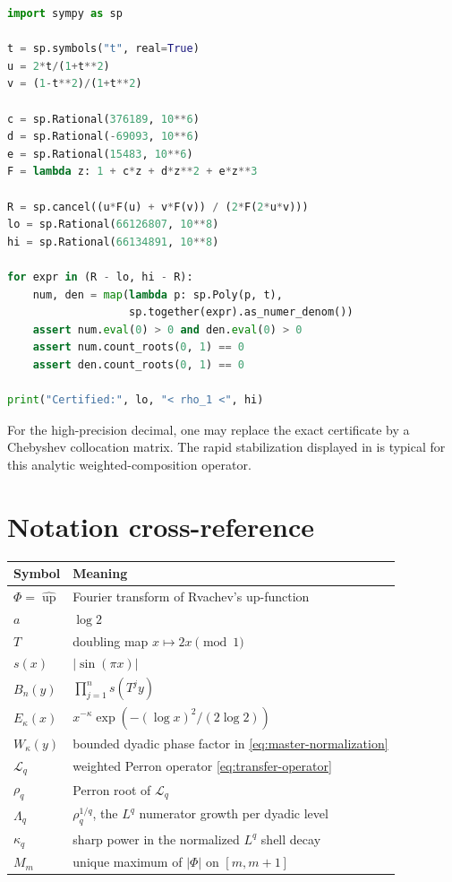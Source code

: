 \documentclass[11pt,oneside]{article}
\theoremstyle{definition}
\theoremstyle{remark}
\newcommand{\Up}{\operatorname{up}}
\newcommand{\Phiup}{\Phi}
\newcommand{\abs}[1]{\left|#1\right|}
\begin{document}
\begin{lstlisting}[style=code,language=Python]
import sympy as sp

t = sp.symbols("t", real=True)
u = 2*t/(1+t**2)
v = (1-t**2)/(1+t**2)

c = sp.Rational(376189, 10**6)
d = sp.Rational(-69093, 10**6)
e = sp.Rational(15483, 10**6)
F = lambda z: 1 + c*z + d*z**2 + e*z**3

R = sp.cancel((u*F(u) + v*F(v)) / (2*F(2*u*v)))
lo = sp.Rational(66126807, 10**8)
hi = sp.Rational(66134891, 10**8)

for expr in (R - lo, hi - R):
    num, den = map(lambda p: sp.Poly(p, t),
                   sp.together(expr).as_numer_denom())
    assert num.eval(0) > 0 and den.eval(0) > 0
    assert num.count_roots(0, 1) == 0
    assert den.count_roots(0, 1) == 0

print("Certified:", lo, "< rho_1 <", hi)
\end{lstlisting}

For the high-precision decimal, one may replace the exact certificate by a Chebyshev
collocation matrix.  The rapid stabilization displayed in  is typical
for this analytic weighted-composition operator.

\section{Notation cross-reference}
\label{app:notation}

\begin{center}
\begin{tabularx}{\textwidth}{@{}lX@{}}
\toprule
Symbol & Meaning\\
\midrule
$\Phiup=\widehat{\Up}$ & Fourier transform of Rvachev's up-function\\
$a$ & $\log2$\\
$T$ & doubling map $x\mapsto2x\pmod1$\\
$s(x)$ & $\abs{\sin(\pi x)}$\\
$B_n(y)$ & $\prod_{j=1}^n s(T^jy)$\\
$E_\kappa(x)$ & $x^{-\kappa}\exp(- (\log x)^2/(2\log2))$\\
$W_\kappa(y)$ & bounded dyadic phase factor in \eqref{eq:master-normalization}\\
$\mathcal L_q$ & weighted Perron operator \eqref{eq:transfer-operator}\\
$\rho_q$ & Perron root of $\mathcal L_q$\\
$\Lambda_q$ & $\rho_q^{1/q}$, the $L^q$ numerator growth per dyadic level\\
$\kappa_q$ & sharp power in the normalized $L^q$ shell decay\\
$M_m$ & unique maximum of $\abs{\Phiup}$ on $[m,m+1]$\\
\bottomrule
\end{tabularx}
\end{center}
\end{document}

